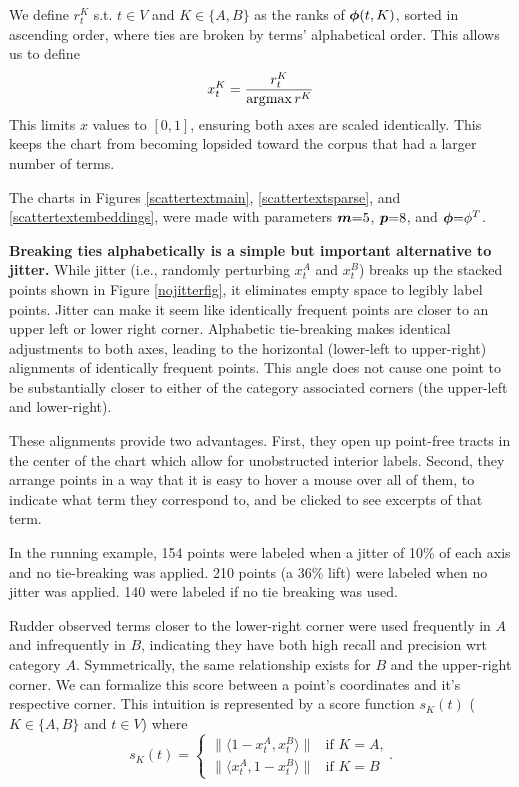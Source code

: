 \documentclass[11pt,a4paper]{article}
\begin{document}
We define $r^{K}_t$ s.t. $t \in V$ and $K \in \{A,B\}$ as the ranks of $\mbox{\boldmath$\phi$}(t,K)$, sorted in ascending order, where ties are broken by terms' alphabetical order.  This allows us to define \vspace{-.2cm}
\begin{equation}
\vspace{-.2cm}
x^{K}_t = \frac{r^{K}_t}{\arg\!\max r^{K}}
\end{equation}
This limits $x$ values to $[0,1]$, ensuring both axes are scaled identically.  This keeps the chart from becoming lopsided toward the corpus that had a larger number of terms. 

The charts in Figures \ref{scattertextmain}, \ref{scattertextsparse}, and \ref{scattertextembeddings}, were made with parameters $\mbox{\boldmath$m$}{=}5$, $\mbox{\boldmath$p$}{=}8$, and $\mbox{\boldmath$\phi$}{=}\phi^{T}$. 

\textbf{Breaking ties alphabetically is a simple but important alternative to jitter.} While jitter (i.e., randomly perturbing $x_{t}^{A}$ and $x_{t}^{B}$) breaks up the stacked points shown in Figure \ref{nojitterfig}, it eliminates empty space to legibly label points.  Jitter can make it seem like identically frequent points are closer to an upper left or lower right corner.  Alphabetic tie-breaking makes identical adjustments to both axes, leading to the horizontal (lower-left to upper-right) alignments of identically frequent points.  This angle does not cause one point to be substantially closer to either of the category associated corners (the upper-left and lower-right). 

These alignments provide two advantages. First, they open up point-free tracts in the center of the chart which allow for unobstructed interior labels. Second, they arrange points in a way that it is easy to hover a mouse over all of them, to indicate what term they correspond to, and be clicked to see excerpts of that term.

In the running example, 154 points were labeled when a jitter of 10\% of each axis and no tie-breaking was applied. 210 points (a 36\% lift) were labeled when no jitter was applied. 140 were labeled if no tie breaking was used.

Rudder  observed terms closer to the lower-right corner were used frequently in $A$ and infrequently in $B$, indicating they have both high recall and precision wrt category $A$.  Symmetrically, the same relationship exists for $B$ and the upper-right corner.  We can formalize this score between a point's coordinates and it's respective corner.  This intuition is represented by a score function $s_K(t)$ ($K\in\{A,B\}$ and $t\in V$) where
\vspace{-.3cm}
\begin{equation}
s_K(t)= 
\begin{cases} \|\langle 1-x_{t}^{A}, x_{t}^{B}\rangle\| & \text{if $K=A$,}
\\
\|\langle x_{t}^{A}, 1-x_{t}^{B}\rangle\| &\text{if $K=B$}
\end{cases}.
  \label{eqn:cornerscore}
\end{equation}
\end{document}
